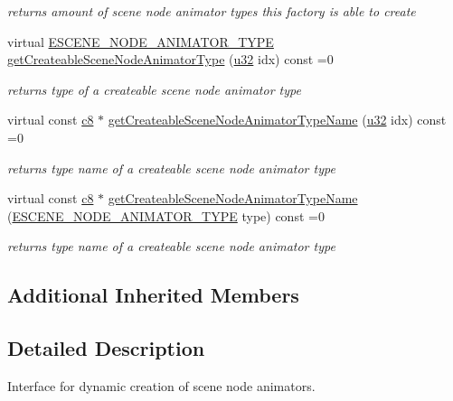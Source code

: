 \begin{DoxyCompactItemize}
\begin{DoxyCompactList}\small\item\em returns amount of scene node animator types this factory is able to create \end{DoxyCompactList}\item 
virtual \hyperlink{namespaceirr_1_1scene_a327a1e43872705cf8f3f3342fb307d19}{E\+S\+C\+E\+N\+E\+\_\+\+N\+O\+D\+E\+\_\+\+A\+N\+I\+M\+A\+T\+O\+R\+\_\+\+T\+Y\+PE} \hyperlink{classirr_1_1scene_1_1ISceneNodeAnimatorFactory_aa8896f3db0963df428da850c42d36649}{get\+Createable\+Scene\+Node\+Animator\+Type} (\hyperlink{namespaceirr_a0416a53257075833e7002efd0a18e804}{u32} idx) const  =0
\begin{DoxyCompactList}\small\item\em returns type of a createable scene node animator type \end{DoxyCompactList}\item 
virtual const \hyperlink{namespaceirr_a9395eaea339bcb546b319e9c96bf7410}{c8} $\ast$ \hyperlink{classirr_1_1scene_1_1ISceneNodeAnimatorFactory_a9ab1422a70438cf923900f168057175f}{get\+Createable\+Scene\+Node\+Animator\+Type\+Name} (\hyperlink{namespaceirr_a0416a53257075833e7002efd0a18e804}{u32} idx) const  =0
\begin{DoxyCompactList}\small\item\em returns type name of a createable scene node animator type \end{DoxyCompactList}\item 
virtual const \hyperlink{namespaceirr_a9395eaea339bcb546b319e9c96bf7410}{c8} $\ast$ \hyperlink{classirr_1_1scene_1_1ISceneNodeAnimatorFactory_ac7ec46c00111b543d8c096790f504016}{get\+Createable\+Scene\+Node\+Animator\+Type\+Name} (\hyperlink{namespaceirr_1_1scene_a327a1e43872705cf8f3f3342fb307d19}{E\+S\+C\+E\+N\+E\+\_\+\+N\+O\+D\+E\+\_\+\+A\+N\+I\+M\+A\+T\+O\+R\+\_\+\+T\+Y\+PE} type) const  =0
\begin{DoxyCompactList}\small\item\em returns type name of a createable scene node animator type \end{DoxyCompactList}\end{DoxyCompactItemize}
\subsection*{Additional Inherited Members}


\subsection{Detailed Description}
Interface for dynamic creation of scene node animators. 

